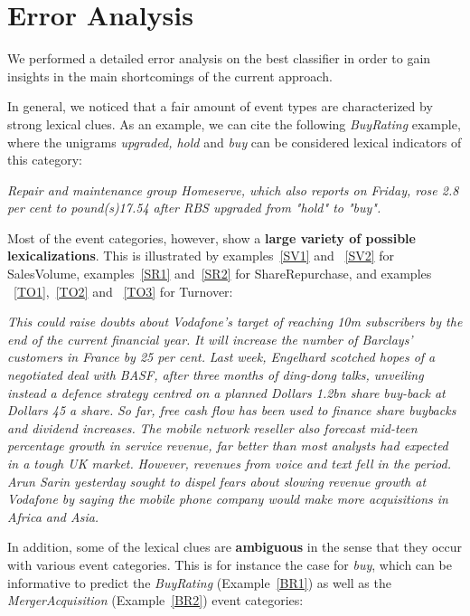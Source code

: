 \documentclass[11pt,a4paper]{article}
\begin{document}
\section{Error Analysis} \label{errorAnalysis}

We performed a detailed error analysis on the best classifier in order to gain insights in the main shortcomings of the current approach. 

In general, we noticed that a fair amount of event types are characterized by strong lexical clues. As an example, we can cite the following \emph{BuyRating} example, where the unigrams \emph{upgraded, hold} and \emph{buy} can be considered lexical indicators of this category:

\begin{exe}
    \ex \emph{Repair and maintenance group Homeserve, which also reports on Friday, rose 2.8 per cent to pound(s)17.54 after RBS upgraded from "hold" to "buy".}\label{ex1}
\end{exe}

Most of the event categories, however, show a \textbf{large variety of possible lexicalizations}.
This is illustrated by examples~\ref{SV1} and ~\ref{SV2} for SalesVolume, examples~\ref{SR1} and~\ref{SR2} for ShareRepurchase, and examples ~\ref{TO1},~\ref{TO2} and ~\ref{TO3} for Turnover:

\begin{exe}
    \ex \emph{This could raise doubts about Vodafone's target of reaching 10m subscribers by the end of the current financial year.}\label{SV1}
    \ex \emph{It will increase the number of Barclays' customers in France by 25 per cent.}\label{SV2}
    \ex \emph{Last week, Engelhard scotched hopes of a negotiated deal with BASF, after three months of ding-dong talks, unveiling instead a defence strategy centred on a planned Dollars 1.2bn share buy-back at Dollars 45 a share.}\label{SR1}
    \ex \emph{So far, free cash flow has been used to finance share buybacks and dividend increases.}\label{SR2}
    \ex \emph{The mobile network reseller also forecast mid-teen percentage growth in service revenue, far better than most analysts had expected in a tough UK market.}\label{TO1}
    \ex \emph{However, revenues from voice and text fell in the period.}\label{TO2}
    \ex \emph{Arun Sarin yesterday sought to dispel fears about slowing revenue growth at Vodafone by saying the mobile phone company would make more acquisitions in Africa and Asia.}\label{TO3}
\end{exe}

In addition, some of the lexical clues are \textbf{ambiguous} in the sense that they occur with various event categories.
This is for instance the case for \emph{buy}, which can be informative to predict the \emph{BuyRating} (Example~\ref{BR1}) as well as the \emph{MergerAcquisition} (Example~\ref{BR2}) event categories:
\end{document}

